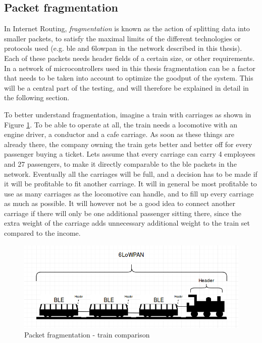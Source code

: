 \subsection{Packet fragmentation}

In Internet Routing, \textit{fragmentation} is known as the action of splitting data into smaller packets, to satisfy the maximal limits of the different technologies or protocols used (e.g. \gls{ble} and \gls{6lowpan} in the network described in this thesis). Each of these packets needs header fields of a certain size, or other requirements. In a network of microcontrollers used in this thesis fragmentation can be a factor that needs to be taken into account to optimize the goodput of the system. This will be a central part of the testing, and will therefore be explained in detail in the following section. 

To better understand fragmentation, imagine a train with carriages as shown in Figure \ref{fig:trainExample}. To be able to operate at all, the train needs a locomotive with an engine driver, a conductor and a cafe carriage. As soon as these things are already there, the company owning the train gets better and better off for every passenger buying a ticket. Lets assume that every carriage can carry 4 employees and 27 passengers, to make it directly comparable to the \gls{ble} packets in the network. Eventually all the carriages will be full, and a decision has to be made if it will be profitable to fit another carriage. It will in general be most profitable to use as many carriages as the locomotive can handle, and to fill up every carriage as much as possible. It will however not be a good idea to connect another carriage if there will only be one additional passenger sitting there, since the extra weight of the carriage adds unnecessary additional weight to the train set compared to the income. 

\begin{figure}[ht]
    \centering
    \includegraphics[scale=0.5]{trainExample.png}    
    \caption{Packet fragmentation - train comparison}
    \label{fig:trainExample}
\end{figure}

